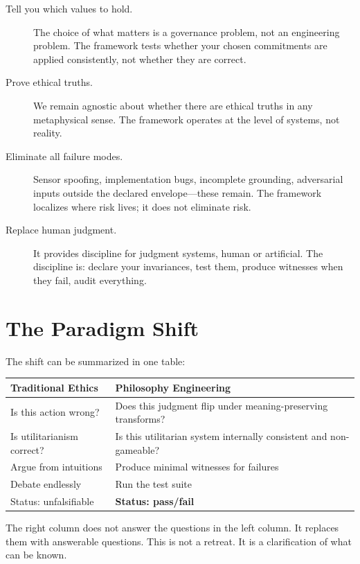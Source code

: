 \documentclass[12pt]{article}
\begin{document}
\begin{description}
  \item[Tell you which values to hold.] The choice of what matters is a governance
    problem, not an engineering problem. The framework tests whether your
    chosen commitments are applied consistently, not whether they are correct.
  \item[Prove ethical truths.] We remain agnostic about whether there are ethical
    truths in any metaphysical sense. The framework operates at the level of
    systems, not reality.
  \item[Eliminate all failure modes.] Sensor spoofing, implementation bugs,
    incomplete grounding, adversarial inputs outside the declared envelope---these
    remain. The framework localizes where risk lives; it does not eliminate
    risk.
  \item[Replace human judgment.] It provides discipline for judgment systems,
    human or artificial. The discipline is: declare your invariances, test them,
    produce witnesses when they fail, audit everything.
\end{description}

\section{The Paradigm Shift}

The shift can be summarized in one table:

\begin{table}[h]
\centering
\begin{tabular}{ll}
\toprule
\textbf{Traditional Ethics} & \textbf{Philosophy Engineering} \\
\midrule
Is this action wrong? & Does this judgment flip under meaning-preserving transforms? \\
Is utilitarianism correct? & Is this utilitarian system internally consistent and non-gameable? \\
Argue from intuitions & Produce minimal witnesses for failures \\
Debate endlessly & Run the test suite \\
Status: unfalsifiable & \textbf{Status: pass/fail} \\
\bottomrule
\end{tabular}
\end{table}

The right column does not answer the questions in the left column. It replaces them
with answerable questions. This is not a retreat. It is a clarification of what can be
known.
\end{document}
